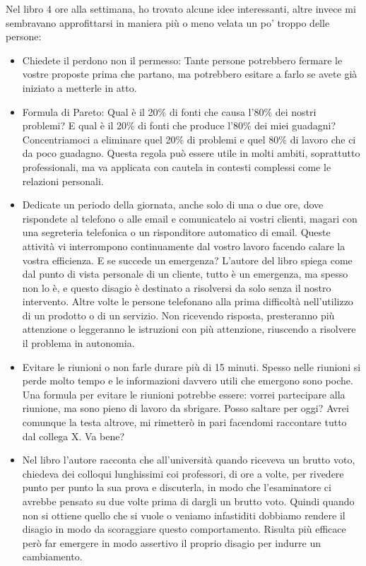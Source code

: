 \documentclass[12pt]{book} %
\begin{document}
\begin{mdframed}[linewidth=1pt]
Nel libro 4 ore alla settimana, ho trovato alcune idee interessanti, altre invece mi sembravano approfittarsi in maniera più o meno velata un po' troppo delle persone:

\begin{itemize}
\item Chiedete il perdono non il permesso: Tante persone potrebbero fermare le vostre proposte prima che partano, ma potrebbero esitare a farlo se avete già iniziato a metterle in atto.
\item Formula di Pareto: Qual è il 20\% di fonti che causa l'80\% dei nostri problemi? E qual è il
20\% di fonti che produce l'80\% dei miei guadagni? Concentriamoci a eliminare quel 20\% di
problemi e quel 80\% di lavoro che ci da poco guadagno. Questa regola può essere utile in molti ambiti, soprattutto professionali, ma va applicata con cautela in contesti complessi come le relazioni personali.
\item Dedicate un periodo della giornata, anche solo di una o due ore, dove rispondete al telefono o alle email e
comunicatelo ai vostri clienti, magari con una segreteria telefonica o un risponditore automatico di email. Queste
attività vi interrompono continuamente dal vostro lavoro facendo calare la vostra efficienza. E se succede un
emergenza? L'autore del libro spiega come dal punto di vista personale di un cliente, tutto è un
emergenza, ma spesso non lo è, e questo disagio è destinato a risolversi da solo senza il nostro intervento. Altre volte
le persone telefonano alla prima difficoltà nell'utilizzo di un prodotto o di un servizio. Non
ricevendo risposta, presteranno più attenzione o leggeranno le istruzioni con più attenzione, riuscendo a risolvere il problema in
autonomia.
\item Evitare le riunioni o non farle durare più di 15 minuti. Spesso nelle riunioni si perde molto tempo e le
informazioni davvero utili che emergono sono poche. Una formula per evitare le riunioni potrebbe essere: vorrei
partecipare alla riunione, ma sono pieno di lavoro da sbrigare. Posso saltare per oggi? Avrei comunque la testa
altrove, mi rimetterò in pari facendomi raccontare tutto dal collega X. Va bene?
\item Nel libro l'autore racconta che all'università quando riceveva un brutto voto, chiedeva dei colloqui lunghissimi
coi professori, di ore a volte, per rivedere punto per punto la sua prova e discuterla, in modo che l'esaminatore ci
avrebbe pensato su due volte prima di dargli un brutto voto. Quindi quando non si ottiene quello che si vuole o veniamo
infastiditi dobbiamo rendere il disagio in modo da scoraggiare questo comportamento. Risulta più efficace però far emergere in modo assertivo il proprio disagio per indurre un cambiamento.
\end{itemize}
\end{mdframed}
\end{document}
